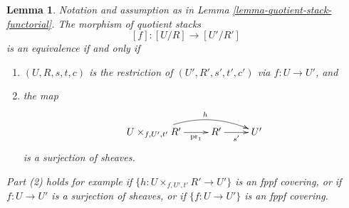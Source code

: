 \documentclass[10pt,a4paper]{amsart}
\theoremstyle{plain}
\newtheorem{lemma}[subsection]{Lemma}
\theoremstyle{definition}
\theoremstyle{remark}
\numberwithin{equation}{subsection}
\begin{document}
\begin{lemma}
\label{lemma-quotient-stack-restrict-equivalence}
Notation and assumption as in
Lemma \ref{lemma-quotient-stack-functorial}.
The morphism of quotient stacks
$$
[f] : [U/R] \longrightarrow [U'/R']
$$
is an equivalence if and only if
\begin{enumerate}
\item $(U, R, s, t, c)$ is the restriction of $(U', R', s', t', c')$
via $f : U \to U'$, and
\item the map
$$
\xymatrix{
U \times_{f, U', t'} R' \ar[r]_-{\text{pr}_1} \ar@/^3ex/[rr]^h
& R' \ar[r]_{s'} & U'
}
$$
is a surjection of sheaves.
\end{enumerate}
Part (2) holds for example if $\{h : U \times_{f, U', t'} R' \to U'\}$
is an fppf covering, or if $f : U \to U'$ is a surjection of sheaves, or if
$\{f : U \to U'\}$ is an fppf covering.
\end{lemma}
\end{document}

